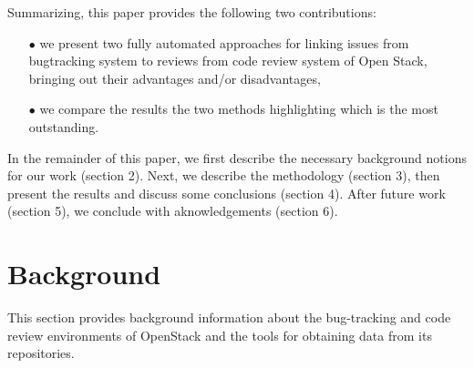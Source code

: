 \documentclass{sig-alternate-05-2015}
\begin{document}

Summarizing, this paper provides the following two contributions:
\begin{itemize}
 \item[$\bullet$] we present two fully automated approaches for linking issues from 
 bugtracking system to reviews from code review system of Open Stack, bringing out their advantages and/or 
 disadvantages,
 \item[$\bullet$] we compare the results the two methods highlighting which is the most outstanding. 
\end{itemize}

In the remainder of this paper, we first describe the necessary background notions for our work (section 2). Next, we describe the 
methodology (section 3), then present the results and discuss some conclusions (section 4). After future work (section 5), 
we conclude with aknowledgements (section 6).

\section{Background}
This section provides background information about the bug-tracking and code review environments of OpenStack and the 
tools for obtaining data from its repositories.
\end{document}
